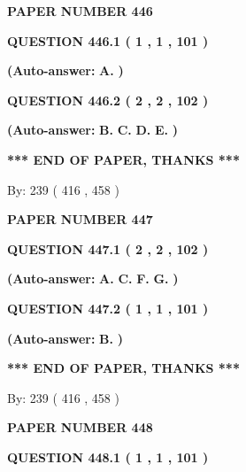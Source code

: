 \documentclass[12pt]{article}
\begin{document}
   
   
   
\newpage 
\setcounter{page}{ 
   446001 } 
   
   
 {\textbf{ \Large{ PAPER NUMBER  446  }}}
   
   
  
  
{\textbf{\large{QUESTION
446.1 
 ( 1 , 1 , 101 )
}}}
 
 
{\textbf{(Auto-answer:}}
{\textbf{\large{
A.}}}
{\textbf{)}}
 
 
  
  
{\textbf{\large{QUESTION
446.2 
 ( 2 , 2 , 102 )
}}}
 
 
{\textbf{(Auto-answer:}}
{\textbf{\large{
B.}}}
{\textbf{\large{
C.}}}
{\textbf{\large{
D.}}}
{\textbf{\large{
E.}}}
{\textbf{)}}
 
 
   
   
\vspace{1.0in} 
{\textbf{\large{ *** END OF PAPER, THANKS *** }}} 
   
   
\hspace{1.0in} By: 
 239 ( 416 ,  458 )
   
   
   
   
\newpage 
\setcounter{page}{ 
   447001 } 
   
   
 {\textbf{ \Large{ PAPER NUMBER  447  }}}
   
   
  
  
{\textbf{\large{QUESTION
447.1 
 ( 2 , 2 , 102 )
}}}
 
 
{\textbf{(Auto-answer:}}
{\textbf{\large{
A.}}}
{\textbf{\large{
C.}}}
{\textbf{\large{
F.}}}
{\textbf{\large{
G.}}}
{\textbf{)}}
 
 
  
  
{\textbf{\large{QUESTION
447.2 
 ( 1 , 1 , 101 )
}}}
 
 
{\textbf{(Auto-answer:}}
{\textbf{\large{
B.}}}
{\textbf{)}}
 
 
   
   
\vspace{1.0in} 
{\textbf{\large{ *** END OF PAPER, THANKS *** }}} 
   
   
\hspace{1.0in} By: 
 239 ( 416 ,  458 )
   
   
   
   
\newpage 
\setcounter{page}{ 
   448001 } 
   
   
 {\textbf{ \Large{ PAPER NUMBER  448  }}}
   
   
  
  
{\textbf{\large{QUESTION
448.1 
 ( 1 , 1 , 101 )
}}}
 
\end{document}
